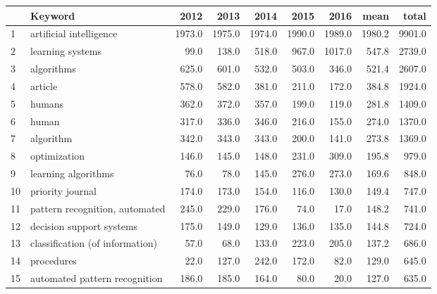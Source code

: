 \begin{tabular}{llrrrrrrr}
\toprule
{} &                                  Keyword &    2012 &    2013 &    2014 &    2015 &    2016 &    mean &   total \\
\midrule
1  &                  artificial intelligence &  1973.0 &  1975.0 &  1974.0 &  1990.0 &  1989.0 &  1980.2 &  9901.0 \\
2  &                         learning systems &    99.0 &   138.0 &   518.0 &   967.0 &  1017.0 &   547.8 &  2739.0 \\
3  &                               algorithms &   625.0 &   601.0 &   532.0 &   503.0 &   346.0 &   521.4 &  2607.0 \\
4  &                                  article &   578.0 &   582.0 &   381.0 &   211.0 &   172.0 &   384.8 &  1924.0 \\
5  &                                   humans &   362.0 &   372.0 &   357.0 &   199.0 &   119.0 &   281.8 &  1409.0 \\
6  &                                    human &   317.0 &   336.0 &   346.0 &   216.0 &   155.0 &   274.0 &  1370.0 \\
7  &                                algorithm &   342.0 &   343.0 &   343.0 &   200.0 &   141.0 &   273.8 &  1369.0 \\
8  &                             optimization &   146.0 &   145.0 &   148.0 &   231.0 &   309.0 &   195.8 &   979.0 \\
9  &                      learning algorithms &    76.0 &    78.0 &   145.0 &   276.0 &   273.0 &   169.6 &   848.0 \\
10 &                         priority journal &   174.0 &   173.0 &   154.0 &   116.0 &   130.0 &   149.4 &   747.0 \\
11 &           pattern recognition, automated &   245.0 &   229.0 &   176.0 &    74.0 &    17.0 &   148.2 &   741.0 \\
12 &                 decision support systems &   175.0 &   149.0 &   129.0 &   136.0 &   135.0 &   144.8 &   724.0 \\
13 &          classification (of information) &    57.0 &    68.0 &   133.0 &   223.0 &   205.0 &   137.2 &   686.0 \\
14 &                               procedures &    22.0 &   127.0 &   242.0 &   172.0 &    82.0 &   129.0 &   645.0 \\
15 &            automated pattern recognition &   186.0 &   185.0 &   164.0 &    80.0 &    20.0 &   127.0 &   635.0 \\

\end{tabular}
